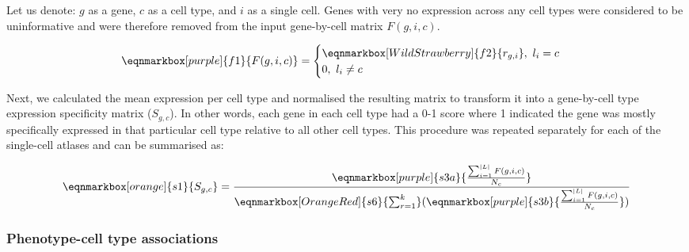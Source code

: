 \documentclass[
sn-nature
]{sn-jnl}
\begin{document}
Let us denote: \(g\) as a gene, \(c\) as a cell type, and \(i\) as a
single cell. Genes with very no expression across any cell types were
considered to be uninformative and were therefore removed from the input
gene-by-cell matrix \(F(g,i,c)\).

\hfill\break

\begin{equation*}
  \eqnmarkbox[purple]{f1}{F(g,i,c)}
  =
  \begin{cases}
  \eqnmarkbox[WildStrawberry]{f2}{r_{g,i}},
  \text{ }l_i = c\\0,
  \text{ }l_i \neq c 
  \end{cases}
\end{equation*}

\hfill\break

Next, we calculated the mean expression per cell type and normalised the
resulting matrix to transform it into a gene-by-cell type expression
specificity matrix (\(S_{g,c}\)). In other words, each gene in each cell
type had a 0-1 score where 1 indicated the gene was mostly specifically
expressed in that particular cell type relative to all other cell types.
This procedure was repeated separately for each of the single-cell
atlases and can be summarised as:

\hfill\break

\begin{equation*}
  \eqnmarkbox[orange]{s1}{S_{g,c}}
  =
  \frac{
    \eqnmarkbox[purple]{s3a}{
      \frac{
        \sum_{i=1}^{|L|} F(g,i,c)
      }{
        N_c  
      }
    } 
  }{
   \eqnmarkbox[OrangeRed]{s6}{\sum_{r=1}^{k}}(
     \eqnmarkbox[purple]{s3b}{
      \frac{
        \sum_{i=1}^{|L|} F(g,i,c)
      }{
        N_c  
      }
    } 
   ) 
  }
\end{equation*}

\hfill\break

\subsubsection{Phenotype-cell type
associations}\label{phenotype-cell-type-associations-1}
\end{document}
